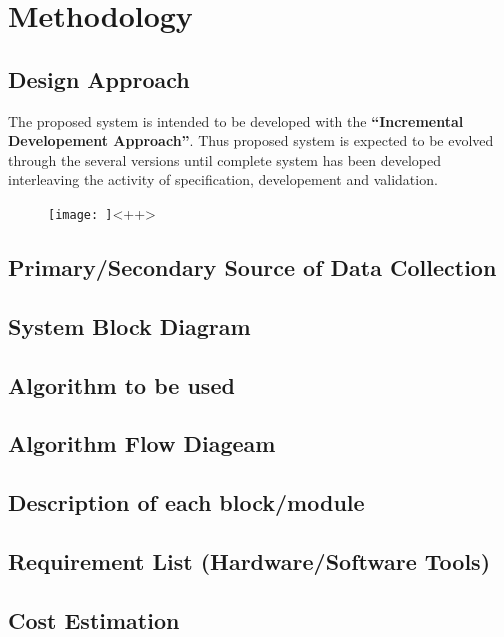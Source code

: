 \documentclass{article}
\begin{document}
\section{Methodology}

\cleardoublepage
\subsection{Design Approach}
The proposed system is intended to be developed with the \textbf{``Incremental Developement Approach''}. Thus proposed system is expected to be evolved through the several versions until complete system has been developed interleaving the activity of specification, developement and validation.
\begin{figure}
	\texttt{[image: ]}<++>
\end{figure}
\cleardoublepage
\subsection{Primary/Secondary Source of Data Collection}
\cleardoublepage


\subsection{System Block Diagram}
\cleardoublepage


\subsection{Algorithm to be used}
\cleardoublepage


\subsection{Algorithm Flow Diageam}
\cleardoublepage

\subsection{Description of each block/module}
\cleardoublepage


\subsection{Requirement List (Hardware/Software Tools)}
\cleardoublepage


\subsection{Cost Estimation}
\cleardoublepage
\end{document}
